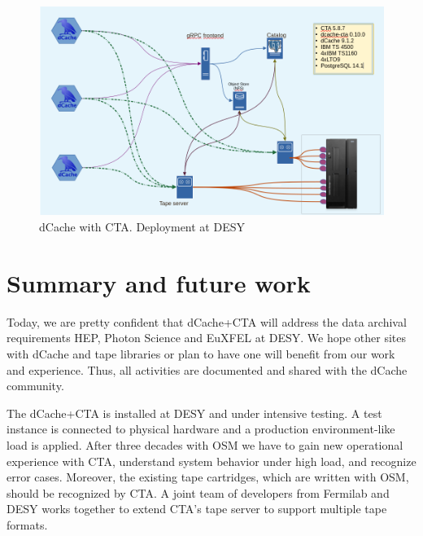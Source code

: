 \documentclass{webofc}
\begin{document}
\begin{figure}[h]
    \centering
    \includegraphics[scale=0.30 ]{cta-deployment-desy.png}
    \caption{dCache with CTA. Deployment at DESY}
    \label{fig:dcache_cta_deplyment}
\end{figure}

\section{Summary and future work}
\label{summary}

Today, we are pretty confident that dCache+CTA will address the data archival requirements HEP, Photon Science and EuXFEL at DESY. We hope other sites with dCache and tape libraries or plan to have one will benefit from our work and experience. Thus, all activities are documented and shared with the dCache community.

The dCache+CTA is installed at DESY and under intensive testing. A test instance is connected to physical hardware and a production environment-like load is applied. After three decades with OSM we have to gain new operational experience with CTA, understand system behavior under high load, and recognize error cases. Moreover, the existing tape cartridges, which are written with OSM, should be recognized by CTA. A joint team of developers from Fermilab and DESY works together to extend CTA's tape server to support multiple tape formats.


\end{document}
